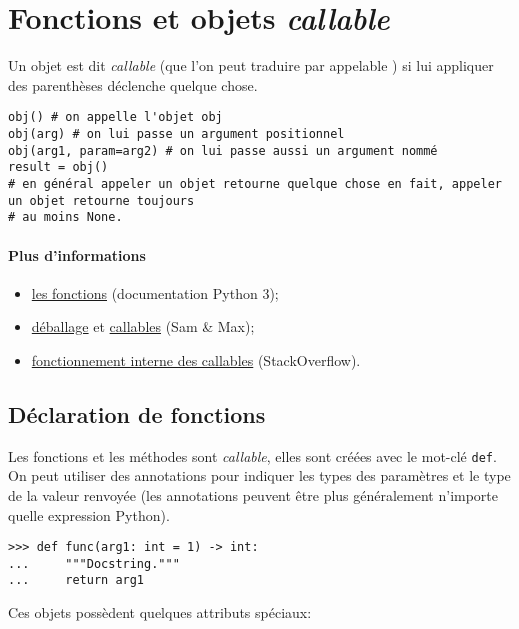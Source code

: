 \section{Fonctions et objets {\normalfont\bfseries\itshape callable}}
Un objet est dit \textit{callable} (que l'on peut traduire par \og appelable \fg{}) si lui appliquer des parenthèses déclenche quelque chose.

\begin{verbatim}
obj() # on appelle l'objet obj
obj(arg) # on lui passe un argument positionnel
obj(arg1, param=arg2) # on lui passe aussi un argument nommé
result = obj() 
# en général appeler un objet retourne quelque chose en fait, appeler un objet retourne toujours
# au moins None.
\end{verbatim}

\paragraph*{Plus d'informations}
\begin{itemize}
    \item \href{https://docs.python.org/3/reference/datamodel.html\#index-32}{les fonctions} (documentation Python 3);
    \item \href{http://sametmax.com/quest-ce-que-lunpacking-en-python-et-a-quoi-ca-sert/}{déballage} et \href{http://sametmax.com/quest-ce-quun-callable-en-python/}{callables} (Sam \& Max);
    \item \href{https://stackoverflow.com/a/32856533/9214306}{fonctionnement interne des callables} (StackOverflow).
\end{itemize}

\subsection{Déclaration de fonctions}

Les fonctions et les méthodes sont \textit{callable}, elles sont créées avec le mot-clé \texttt{def}. On
peut utiliser des annotations pour indiquer les types des paramètres et le type de la valeur renvoyée (les annotations
peuvent être plus généralement n'importe quelle expression Python).

\begin{verbatim}
>>> def func(arg1: int = 1) -> int:
...     """Docstring."""
...     return arg1
\end{verbatim}

Ces objets possèdent quelques attributs spéciaux:

